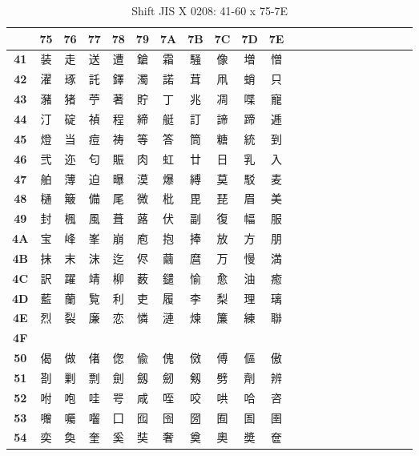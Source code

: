 \begin{table}[H]
\centering
\caption{Shift JIS X 0208: 41-60 x 75-7E}
\begin{tabular}{|Sc|Sc|Sc|Sc|Sc|Sc|Sc|Sc|Sc|Sc|Sc|}
\hline
 & \textbf{75} & \textbf{76} & \textbf{77} & \textbf{78} & \textbf{79} & \textbf{7A} & \textbf{7B} & \textbf{7C} & \textbf{7D} & \textbf{7E} \\ \hline
\textbf{41} & 装 & 走 & 送 & 遭 & 鎗 & 霜 & 騒 & 像 & 増 & 憎 \\ \hline
\textbf{42} & 濯 & 琢 & 託 & 鐸 & 濁 & 諾 & 茸 & 凧 & 蛸 & 只 \\ \hline
\textbf{43} & 瀦 & 猪 & 苧 & 著 & 貯 & 丁 & 兆 & 凋 & 喋 & 寵 \\ \hline
\textbf{44} & 汀 & 碇 & 禎 & 程 & 締 & 艇 & 訂 & 諦 & 蹄 & 逓 \\ \hline
\textbf{45} & 燈 & 当 & 痘 & 祷 & 等 & 答 & 筒 & 糖 & 統 & 到 \\ \hline
\textbf{46} & 弐 & 迩 & 匂 & 賑 & 肉 & 虹 & 廿 & 日 & 乳 & 入 \\ \hline
\textbf{47} & 舶 & 薄 & 迫 & 曝 & 漠 & 爆 & 縛 & 莫 & 駁 & 麦 \\ \hline
\textbf{48} & 樋 & 簸 & 備 & 尾 & 微 & 枇 & 毘 & 琵 & 眉 & 美 \\ \hline
\textbf{49} & 封 & 楓 & 風 & 葺 & 蕗 & 伏 & 副 & 復 & 幅 & 服 \\ \hline
\textbf{4A} & 宝 & 峰 & 峯 & 崩 & 庖 & 抱 & 捧 & 放 & 方 & 朋 \\ \hline
\textbf{4B} & 抹 & 末 & 沫 & 迄 & 侭 & 繭 & 麿 & 万 & 慢 & 満 \\ \hline
\textbf{4C} & 訳 & 躍 & 靖 & 柳 & 薮 & 鑓 & 愉 & 愈 & 油 & 癒 \\ \hline
\textbf{4D} & 藍 & 蘭 & 覧 & 利 & 吏 & 履 & 李 & 梨 & 理 & 璃 \\ \hline
\textbf{4E} & 烈 & 裂 & 廉 & 恋 & 憐 & 漣 & 煉 & 簾 & 練 & 聯 \\ \hline
\textbf{4F} &  &  &  &  &  &  &  &  &  &  \\ \hline
\textbf{50} & 偈 & 做 & 偖 & 偬 & 偸 & 傀 & 傚 & 傅 & 傴 & 傲 \\ \hline
\textbf{51} & 剳 & 剿 & 剽 & 劍 & 劔 & 劒 & 剱 & 劈 & 劑 & 辨 \\ \hline
\textbf{52} & 咐 & 咆 & 哇 & 咢 & 咸 & 咥 & 咬 & 哄 & 哈 & 咨 \\ \hline
\textbf{53} & 囎 & 囑 & 囓 & 囗 & 囮 & 囹 & 圀 & 囿 & 圄 & 圉 \\ \hline
\textbf{54} & 奕 & 奐 & 奎 & 奚 & 奘 & 奢 & 奠 & 奧 & 奬 & 奩 \\ \hline

\end{tabular}
\end{table}
